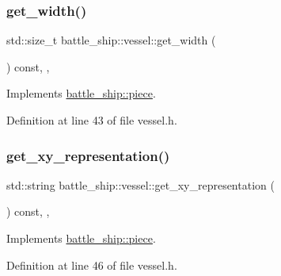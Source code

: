 \mbox{\label{classbattle__ship_1_1vessel_a625d8f457a7afdafea7422ad89648123}} 
\subsubsection{\texorpdfstring{get\+\_\+width()}{get\_width()}}
{\footnotesize\ttfamily std\+::size\+\_\+t battle\+\_\+ship\+::vessel\+::get\+\_\+width (\begin{DoxyParamCaption}{ }\end{DoxyParamCaption}) const\hspace{0.3cm}{\ttfamily [inline]}, {\ttfamily [override]}, {\ttfamily [virtual]}}



Implements \hyperlink{classbattle__ship_1_1piece_a680897abc6ae9c5e187003a1c24fc9a1}{battle\+\_\+ship\+::piece}.



Definition at line 43 of file vessel.\+h.

\mbox{\label{classbattle__ship_1_1vessel_a84bfaba9be4f15f6ec934c925d11967d}} 
\subsubsection{\texorpdfstring{get\+\_\+xy\+\_\+representation()}{get\_xy\_representation()}}
{\footnotesize\ttfamily std\+::string battle\+\_\+ship\+::vessel\+::get\+\_\+xy\+\_\+representation (\begin{DoxyParamCaption}{ }\end{DoxyParamCaption}) const\hspace{0.3cm}{\ttfamily [inline]}, {\ttfamily [override]}, {\ttfamily [virtual]}}



Implements \hyperlink{classbattle__ship_1_1piece_ad589faff3ce07b5130bfdd89da4269c1}{battle\+\_\+ship\+::piece}.



Definition at line 46 of file vessel.\+h.

